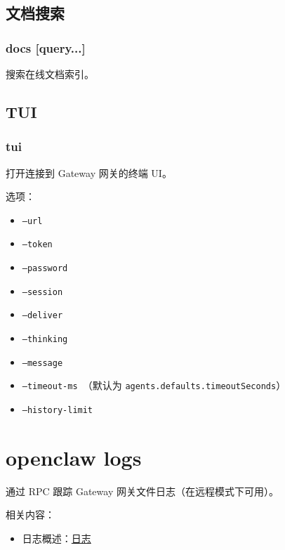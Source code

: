 \subsection{文档搜索}


\subsubsection{docs [query...]}


搜索在线文档索引。

\subsection{TUI}


\subsubsection{tui}


打开连接到 Gateway 网关的终端 UI。

选项：

\begin{itemize}
  \item \texttt{--url }
  \item \texttt{--token }
  \item \texttt{--password }
  \item \texttt{--session }
  \item \texttt{--deliver}
  \item \texttt{--thinking }
  \item \texttt{--message }
  \item \texttt{--timeout-ms }（默认为 \texttt{agents.defaults.timeoutSeconds}）
  \item \texttt{--history-limit }
\end{itemize}



\clearpage

\section{openclaw logs}


通过 RPC 跟踪 Gateway 网关文件日志（在远程模式下可用）。

相关内容：

\begin{itemize}
  \item 日志概述：\href{/logging}{日志}
\end{itemize}



